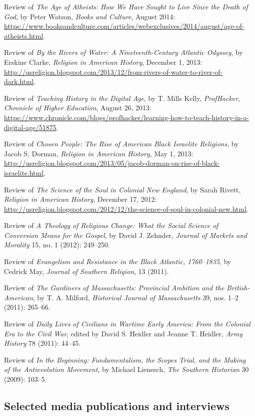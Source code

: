 \documentclass[11pt]{article}
\begin{document}
Review of \emph{The Age of Atheists: How We Have Sought to Live Since the Death of God}, by Peter Watson, \emph{Books and Culture}, August 2014: \url{https://www.booksandculture.com/articles/webexclusives/2014/august/age-of-atheists.html}.

Review of \emph{By the Rivers of Water: A Nineteenth-Century Atlantic Odyssey}, by Erskine Clarke, \emph{Religion in American History}, December 1, 2013: \url{http://usreligion.blogspot.com/2013/12/from-rivers-of-water-to-river-of-dark.html}.

Review of \emph{Teaching History in the Digital Age}, by T. Mills Kelly, \emph{ProfHacker}, \emph{Chronicle of Higher Education}, August 26, 2013: \url{https://www.chronicle.com/blogs/profhacker/learning-how-to-teach-history-in-a-digital-age/51875}.

Review of \emph{Chosen People: The Rise of American Black Israelite Religions}, by Jacob S. Dorman, \emph{Religion in American History}, May 1, 2013: \url{http://usreligion.blogspot.com/2013/05/jacob-dorman-on-rise-of-black-israelite.html}.

Review of \emph{The Science of the Soul in Colonial New England}, by Sarah Rivett, \emph{Religion in American History}, December 17, 2012: \url{http://usreligion.blogspot.com/2012/12/the-science-of-soul-in-colonial-new.html}.

Review of \emph{A Theology of Religious Change: What the Social Science of Conversion Means for the Gospel}, by David J. Zehnder, \emph{Journal of Markets and Morality} 15, no. 1 (2012): 249--250.

Review of \emph{Evangelism and Resistance in the Black Atlantic, 1760--1835}, by Cedrick May, \emph{Journal of Southern Religion}, 13 (2011).

Review of \emph{The Gardiners of Massachusetts: Provincial Ambition and the British-American}, by T. A. Milford, \emph{Historical Journal of Massachusetts} 39, nos. 1--2 (2011): 265--66.

Review of \emph{Daily Lives of Civilians in Wartime Early America: From the Colonial Era to the Civil War}, edited by David S. Heidler and Jeanne T. Heidler, \emph{Army History} 78 (2011): 44--45.

Review of \emph{In the Beginning: Fundamentalism, the Scopes Trial, and the Making of the Antievolution Movement}, by Michael Lienesch, \emph{The Southern Historian} 30 (2009): 103--5.

\subsection{Selected media publications and interviews}\label{Selected media}
\end{document}
